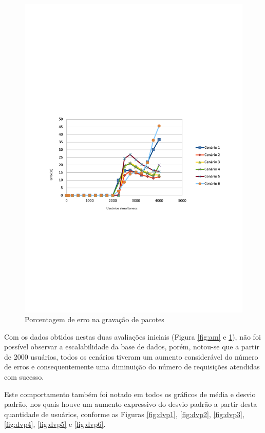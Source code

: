     \begin{figure}[H]
    \centering
    \includegraphics[scale=0.85]{imagens/erroXmin.pdf}
    \caption{Porcentagem de erro na gravação de pacotes}
    \label{fig:erro}
    \end{figure}
    
    
Com os dados obtidos nestas duas avaliações iniciais (Figura \ref{fig:am} e \ref{fig:erro}), não foi possível observar a escalabilidade da base de dados, porém, notou-se que a partir de 2000 usuários, todos os cenários tiveram um aumento considerável do número de erros e consequentemente uma diminuição do número de requisições atendidas com sucesso. 

Este comportamento também foi notado em todos os gráficos de média e desvio padrão, nos quais houve um aumento expressivo do desvio padrão a partir desta quantidade de usuários, conforme as Figuras \ref{fig:dvp1}, \ref{fig:dvp2}, \ref{fig:dvp3}, \ref{fig:dvp4}, \ref{fig:dvp5} e \ref{fig:dvp6}. 

